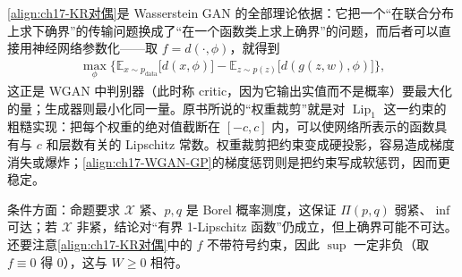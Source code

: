\documentclass[../../main.tex]{subfiles}
\begin{document}
\begin{remark}
\eqref{align:ch17-KR对偶}是 Wasserstein GAN 的全部理论依据：它把一个“在联合分布上求下确界”的传输问题换成了“在一个函数类上求上确界”的问题，而后者可以直接用神经网络参数化——取 $f=d(\cdot,\phi)$，就得到
\begin{align*}
\max_{\phi}\Big\{\mathbb{E}_{x\sim p_{\mathrm{data}}}\big[d(x,\phi)\big]-\mathbb{E}_{z\sim p(z)}\big[d(g(z,w),\phi)\big]\Big\},
\end{align*}
这正是 WGAN 中判别器（此时称 critic，因为它输出实值而不是概率）要最大化的量；生成器则最小化同一量。原书所说的“权重裁剪”就是对 $\operatorname{Lip}_1$ 这一约束的粗糙实现：把每个权重的绝对值截断在 $[-c,c]$ 内，可以使网络所表示的函数具有与 $c$ 和层数有关的 Lipschitz 常数。权重裁剪把约束变成硬投影，容易造成梯度消失或爆炸；\eqref{align:ch17-WGAN-GP}的梯度惩罚则是把约束写成软惩罚，因而更稳定。

条件方面：命题要求 $\mathcal{X}$ 紧、$p,q$ 是 Borel 概率测度，这保证 $\Pi(p,q)$ 弱紧、$\inf$ 可达；若 $\mathcal{X}$ 非紧，结论对“有界 1-Lipschitz 函数”仍成立，但上确界可能不可达。还要注意\eqref{align:ch17-KR对偶}中的 $f$ 不带符号约束，因此 $\sup$ 一定非负（取 $f\equiv0$ 得 $0$），这与 $W\geqslant0$ 相符。
\end{remark}
\end{document}
